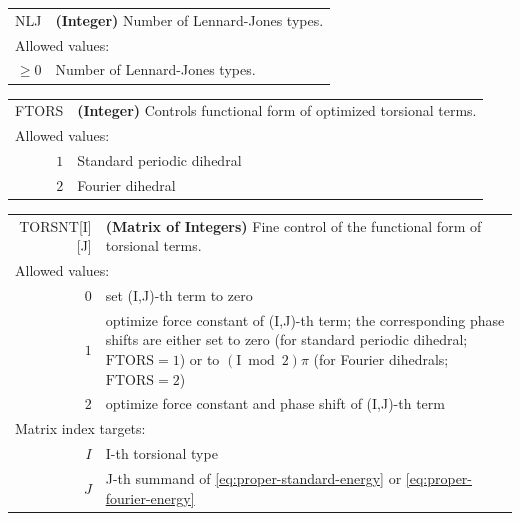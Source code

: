 \documentclass[10pt,a4paper,openany]{memoir}
\numberwithin{equation}{section}
\newcommand{\varset}[2]{$\text{#1}=#2$}
\begin{document}
{
\begin{tabular}{r@{ : }l}
\label{descr:nlj}
       NLJ&\textbf{(Integer)} Number of Lennard-Jones types.                                                   \\ 
\multicolumn{2}{l}{Allowed values:} \\ 
     \( \geq 0\)&  Number of Lennard-Jones types.                                                         \\ 
\end{tabular}
\vspace{1ex}
}


{
\begin{tabular}{r@{ : }l}
\label{descr:ftors}
     FTORS&\textbf{(Integer)} Controls functional form of optimized torsional terms.                                                         \\ 
\multicolumn{2}{l}{Allowed values:} \\ 
     \(1\)&Standard periodic dihedral                                                                           \\ 
     \(2\)&Fourier dihedral                                                                          \\ 
\end{tabular}
\vspace{1ex}
}

{
  \begin{tabular}{r@{ : }p{80ex}}
\label{descr:torsnt}
    TORSNT[I][J]&\textbf{(Matrix of Integers)} Fine control of the functional form of torsional terms.                                               \\ 
\multicolumn{2}{l}{Allowed values:} \\ 
     \(0\)&set (I,J)-th term to zero                                                                                \\ 
     \(1\)&optimize force constant of (I,J)-th term; the corresponding phase shifts are either set to zero (for standard periodic dihedral; \varset{FTORS}{1}) or to $(\text{I} \bmod 2)\pi$ (for Fourier dihedrals; \varset{FTORS}{2})                                                                                    \\
  \(2\)&optimize force constant and phase shift of (I,J)-th term                                                                                   \\ 
\multicolumn{2}{l}{Matrix index targets:} \\ 
     \(I\)&I-th torsional type                                                                    \\ 
     \(J\)&J-th summand of \autoref{eq:proper-standard-energy} or \autoref{eq:proper-fourier-energy}                                                                                          \\ 
\end{tabular}
\vspace{1ex}
}
\end{document}
